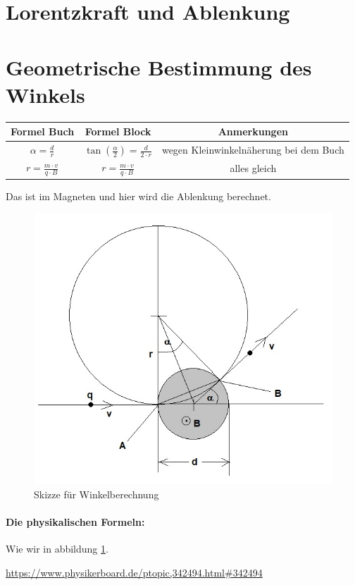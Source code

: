 \section{Lorentzkraft und Ablenkung}

\section{Geometrische Bestimmung des Winkels}

\begin{tabular}{c|c|c}
     Formel Buch & Formel Block & Anmerkungen  \\
     \hline
    $\alpha = \frac{d}{r}$ &$\tan(\frac{\alpha}{2}) = \frac{d}{2\cdot r}$& wegen Kleinwinkelnäherung bei dem Buch \\
    \hline
   $r = \frac{m\cdot v}{q\cdot B}$  & $r = \frac{m\cdot v}{q\cdot B}$& alles gleich 
     
\end{tabular}


Das ist im Magneten und hier wird die Ablenkung berechnet.
\begin{figure}
    \centering
    \includegraphics[width=.75\textwidth]{fig/elektronenstrahl-ablenkung_101.jpg}
    \caption{Skizze für Winkelberechnung}
    \label{fig:ausBlock}
\end{figure}

\paragraph{Die physikalischen Formeln:}

Wie wir in abbildung \ref{fig:ausBlock}.

\url{https://www.physikerboard.de/ptopic,342494.html#342494}

